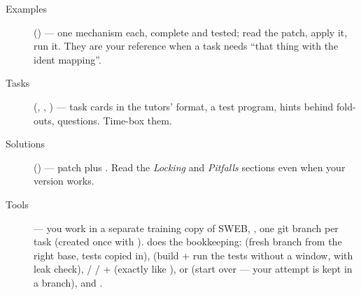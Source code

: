 \begin{description}
\item[Examples] () --- one mechanism each, complete and tested; read the
  patch, apply it, run it. They are your reference when a task needs ``that thing with the
  ident mapping''.
\item[Tasks] (, , ) --- task cards in the tutors' format, a
  test program, hints behind fold-outs, questions. Time-box them.
\item[Solutions] () --- patch plus . Read the \emph{Locking}
  and \emph{Pitfalls} sections even when your version works.
\item[Tools] --- you work in a separate training copy of SWEB, , one git
  branch per task (created once with ).  does the bookkeeping:
   (fresh branch from the right base, tests copied in),
   (build + run the tests without a window, with leak check),
   /  /  +  (exactly like ),
   or  (start over --- your attempt is kept in a
   branch),  and .
\end{description}
